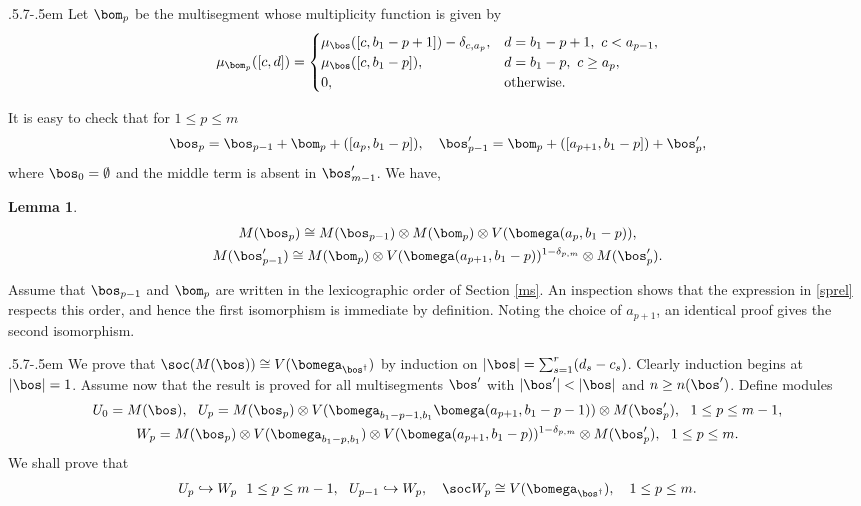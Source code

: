 \documentclass[11pt,reqno]{amsart}
\makeatletter
\newtheorem*{lem}{Lemma}
\theoremstyle{definition} \newtheorem*{defn}{Definition}
\theoremstyle{definition}
\newenvironment{pf}{\proof}{\endproof}
\numberwithin{equation}{section}
\def\subsection{\def\@secnumfont{\bfseries}\@startsection{subsection}{2}%
  {\parindent}{.5\linespacing\@plus.7\linespacing}{-.5em}%
  {\normalfont\bfseries}}
\makeatother
\begin{document}
\subsection{}\label{mp} Let $\bom_p$ be the multisegment whose multiplicity function is given by $$\mu_{\bom_p}([c,d])=\begin{cases}\mu_\bos([c,b_1-p+1])-\delta_{c,a_p}, & d=b_1-p+1,\ c<a_{p-1},\\ \mu_\bos([c,b_1-p]), & d=b_1-p,\ c\ge a_p,\\ 0,&\text{otherwise.}\end{cases}$$

It is easy to check that for $1\le p\le m$
\begin{equation}\label{sprel}\bos_p=\bos_{p-1} + \bom_p + ([a_p,b_1-p]),\ \ \ \bos'_{p-1}=\bom_p + ([a_{p+1},b_1-p]) +\bos'_p,
\end{equation}
where $\bos_0=\emptyset$ and the middle term is absent in $\bos_{m-1}'$.
We have,

\begin{lem}\label{mplem}
\begin{gather*}M(\bos_p)\cong M(\bos_{p-1})\otimes M(\bom_p)\otimes V(\bomega(a_p,b_1-p)),\\
M(\bos_{p-1}')\cong M(\bom_p)\otimes V(\bomega(a_{p+1},b_1-p))^{1-\delta_{p,m}}\otimes M(\bos'_p).
\end{gather*}
\end{lem}
\begin{pf}Assume that $\bos_{p-1}$ and $\bom_p$ are written in the lexicographic order of Section
\ref{ms}. An inspection shows that the expression in \eqref{sprel} respects this order, and hence
the first isomorphism is immediate by definition. Noting the  choice of $a_{p+1}$, an identical proof gives the second isomorphism.
\end{pf}

\subsection{}\label{induction}  We prove that $\soc (M(\bos))\cong V(\bomega_{\bos^\dagger})$ by induction on $|\bos|=\sum_{s=1}^r(d_s-c_s)$. Clearly induction begins at $|\bos|=1$. Assume now that the result is proved for all multisegments $\bos'$ with $|\bos'|<|\bos|$ and
$n\ge n(\bos')$.
Define modules
\begin{gather*} U_0= M(\bos),\ \ U_p= M(\bos_p)\otimes V(\bomega_{b_1-p-1,b_1}\bomega(a_{p+1}, b_1-p-1))\otimes M(\bos_{p}'),\ \ 1\le p\le m-1,\\ W_p= M(\bos_p)\otimes V(\bomega_{b_1-p,b_1})\otimes V(\bomega(a_{p+1},b_1-p))^{1-\delta_{p,m}}\otimes  M(\bos_p'), \ \ 1\le p\le m.
\end{gather*}
We shall prove that
\begin{gather}\label{uw}
U_p\hookrightarrow W_p\ \ 1\le p\le m-1,\ \  U_{p-1}\hookrightarrow W_{p},\ \ \  \soc W_p\cong V(\bomega_{\bos^\dagger}),\ \ \ 1\le p\le m.
\end{gather}
\end{document}
